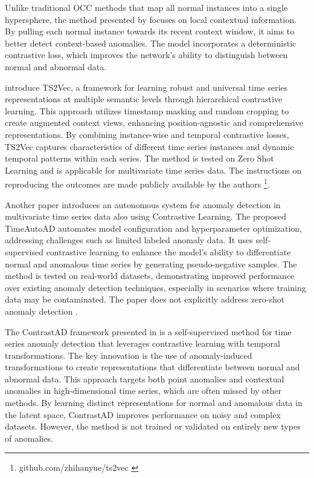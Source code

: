 Unlike traditional OCC methods that map all normal instances into a single hypersphere, the method presented by \cite{chen_time-series_2023} focuses on local contextual information. By pulling each normal instance towards its recent context window, it aims to better detect context-based anomalies. The model incorporates a deterministic contrastive loss, which improves the network's ability to distinguish between normal and abnormal data.

\cite{yue_ts2vec_2022} introduce TS2Vec, a framework for learning robust and universal time series representations at multiple semantic levels through hierarchical contrastive learning. This approach utilizes timestamp masking and random cropping to create augmented context views, enhancing position-agnostic and comprehensive representations. By combining instance-wise and temporal contrastive losses, TS2Vec captures characteristics of different time series instances and dynamic temporal patterns within each series. The method is tested on Zero Shot Learning and is applicable for multivariate time series data. The instructions on reproducing the outcomes are made publicly available by the authors \footnote{\fussy\tiny github.com/zhihanyue/ts2vec \label{foot_ts2vec}}.

Another paper introduces an autonomous system for anomaly detection in multivariate time series data also using Contrastive Learning. The proposed TimeAutoAD automates model configuration and hyperparameter optimization, addressing challenges such as limited labeled anomaly data. It uses self-supervised contrastive learning to enhance the model's ability to differentiate normal and anomalous time series by generating pseudo-negative samples. The method is tested on real-world datasets, demonstrating improved performance over existing anomaly detection techniques, especially in scenarios where training data may be contaminated. The paper does not explicitly address zero-shot anomaly detection \cite{jiao_timeautoad_2022}.

The ContrastAD framework presented in \cite{li_contrastive_2023} is a self-supervised method for time series anomaly detection that leverages contrastive learning with temporal transformations. The key innovation is the use of anomaly-induced transformations to create representations that differentiate between normal and abnormal data. This approach targets both point anomalies and contextual anomalies in high-dimensional time series, which are often missed by other methods. By learning distinct representations for normal and anomalous data in the latent space, ContrastAD improves performance on noisy and complex datasets. However, the method is not trained or validated on entirely new types of anomalies.


